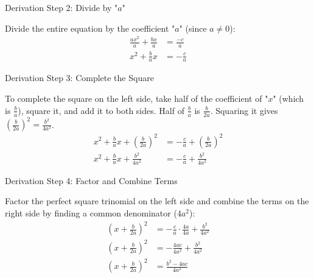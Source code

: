 \documentclass[aspectratio=169]{beamer}
\begin{document}
\begin{frame}{Derivation Step 2: Divide by "$a$"}
    \begin{tcolorbox}[colback=lightgray,colframe=accent,title=Step 2]
        \footnotesize
        Divide the entire equation by the coefficient "$a$" (since $a \neq 0$):
        \begin{align*}
            \frac{ax^2}{a} + \frac{bx}{a} &= \frac{-c}{a} \\
            x^2 + \frac{b}{a}x &= -\frac{c}{a}
        \end{align*}
    \end{tcolorbox}
\end{frame}

\begin{frame}{Derivation Step 3: Complete the Square}
    \begin{tcolorbox}[colback=lightgray,colframe=accent,title=Step 3]
        \footnotesize
        To complete the square on the left side, take half of the coefficient of "$x$" (which is $\frac{b}{a}$), square it, and add it to both sides.
        Half of $\frac{b}{a}$ is $\frac{b}{2a}$. Squaring it gives $\left(\frac{b}{2a}\right)^2 = \frac{b^2}{4a^2}$.
        \begin{align*}
            x^2 + \frac{b}{a}x + \left(\frac{b}{2a}\right)^2 &= -\frac{c}{a} + \left(\frac{b}{2a}\right)^2 \\
            x^2 + \frac{b}{a}x + \frac{b^2}{4a^2} &= -\frac{c}{a} + \frac{b^2}{4a^2}
        \end{align*}
    \end{tcolorbox}
\end{frame}

\begin{frame}{Derivation Step 4: Factor and Combine Terms}
    \begin{tcolorbox}[colback=lightgray,colframe=accent,title=Step 4]
        \footnotesize
        Factor the perfect square trinomial on the left side and combine the terms on the right side by finding a common denominator ($4a^2$):
        \begin{align*}
            \left(x + \frac{b}{2a}\right)^2 &= -\frac{c}{a} \cdot \frac{4a}{4a} + \frac{b^2}{4a^2} \\
            \left(x + \frac{b}{2a}\right)^2 &= -\frac{4ac}{4a^2} + \frac{b^2}{4a^2} \\
            \left(x + \frac{b}{2a}\right)^2 &= \frac{b^2 - 4ac}{4a^2}
        \end{align*}
    \end{tcolorbox}
\end{frame}
\end{document}
